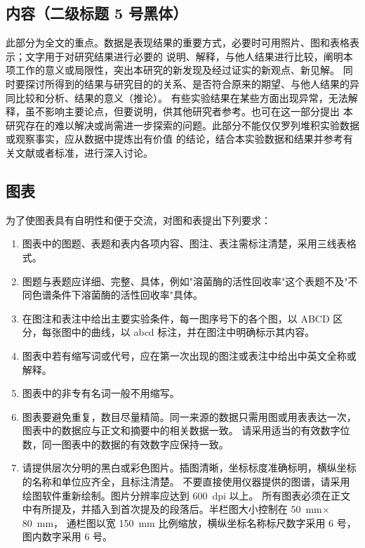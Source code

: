 \documentclass[a4paper]{article}
\begin{document}
\subsection{内容（二级标题 5 号黑体）}

此部分为全文的重点。数据是表现结果的重要方式，必要时可用照片、图和表格表示；文字用于对研究结果进行必要的
说明、解释，与他人结果进行比较，阐明本项工作的意义或局限性，突出本研究的新发现及经过证实的新观点、新见解。
同时要探讨所得到的结果与研究目的的关系、是否符合原来的期望、与他人结果的异同比较和分析、结果的意义（推论）。
有些实验结果在某些方面出现异常，无法解释，虽不影响主要论点，但要说明，供其他研究者参考。也可在这一部分提出
本研究存在的难以解决或尚需进一步探索的问题。此部分不能仅仅罗列堆积实验数据或观察事实，应从数据中提炼出有价值
的结论，结合本实验数据和结果并参考有关文献或者标准，进行深入讨论。

\subsection{图表}

为了使图表具有自明性和便于交流，对图和表提出下列要求：

\begin{enumerate}[label=(\arabic*),leftmargin=3em,itemsep=0pt,parsep=0pt,topsep=4pt]
	\item 图表中的图题、表题和表内各项内容、图注、表注需标注清楚，采用三线表格式。
	\item 图题与表题应详细、完整、具体，例如"溶菌酶的活性回收率"这个表题不及"不同色谱条件下溶菌酶的活性回收率"具体。
	\item 在图注和表注中给出主要实验条件，每一图序号下的各个图，以 ABCD 区分，每张图中的曲线，以 abcd 标注，并在图注中明确标示其内容。
	\item 图表中若有缩写词或代号，应在第一次出现的图注或表注中给出中英文全称或解释。
	\item 图表中的非专有名词一般不用缩写。
	\item 图表要避免重复，数目尽量精简。同一来源的数据只需用图或用表表达一次，图表中的数据应与正文和摘要中的相关数据一致。
	      请采用适当的有效数字位数，同一图表中的数据的有效数字应保持一致。
	\item 请提供层次分明的黑白或彩色图片。插图清晰，坐标标度准确标明，横纵坐标的名称和单位应齐全，且标注清楚。
	      不要直接使用仪器提供的图谱，请采用绘图软件重新绘制。图片分辨率应达到 600~dpi 以上。
	      所有图表必须在正文中有所提及，并插入到首次提及的段落后。半栏图大小控制在 50~mm$\times$80~mm，
	      通栏图以宽 150~mm 比例缩放，横纵坐标名称标尺数字采用 6 号，图内数字采用 6 号。
\end{enumerate}
\end{document}
